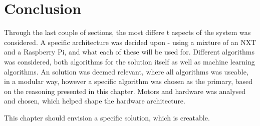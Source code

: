 \section{Conclusion}
Through the last couple of sections, the most differe t aspects of the system was considered.
A specific architecture was decided upon - using a mixture of an NXT and a Raspberry Pi, and what each of these will be used for.
Different algorithms was considered, both algorithms for the solution itself as well as machine learning algorithms.
An solution was deemed relevant, where all algorithms was useable, in a modular way, however a specific algorithm was chosen as the primary, based on the reasoning presented in this chapter.
Motors and hardware was analysed and chosen, which helped shape the hardware architecture.


This chapter should envision a specific solution, which is creatable. 
